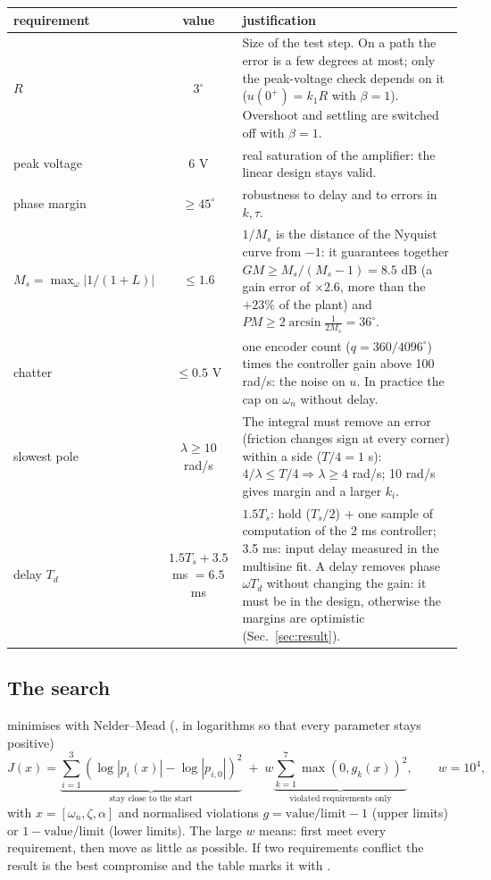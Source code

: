 \documentclass[10pt,a4paper]{article}
\newcommand{\code}[1]{\texttt{\detokenize{#1}}}
\begin{document}
\begin{tabularx}{\linewidth}{@{}l c X@{}}
\toprule
requirement & value & justification \\
\midrule
$R$ & 3$^\circ$ &
  Size of the test step. On a path the error is a few degrees at most; only the peak-voltage check depends on it
  ($u(0^+)=k_1R$ with $\beta=1$). Overshoot and settling are switched off with $\beta=1$. \\
peak voltage & 6 V & real saturation of the amplifier: the linear design stays valid. \\
phase margin & $\geq45^\circ$ & robustness to delay and to errors in $k,\tau$. \\
$M_s=\max_\omega|1/(1+L)|$ & $\leq1.6$ &
  $1/M_s$ is the distance of the Nyquist curve from $-1$: it guarantees together
  $GM\geq M_s/(M_s-1)=8.5$ dB (a gain error of $\times2.6$, more than the $+23\%$ of the plant) and
  $PM\geq2\arcsin\frac{1}{2M_s}=36^\circ$. \\
chatter & $\leq0.5$ V &
  one encoder count ($q=360/4096^\circ$) times the controller gain above 100 rad/s: the noise on $u$.
  In practice the cap on $\omega_n$ without delay. \\
slowest pole & $\lambda\geq10$ rad/s &
  The integral must remove an error (friction changes sign at every corner) within a side ($T/4=1$ s):
  $4/\lambda\leq T/4\Rightarrow\lambda\geq4$ rad/s; 10 rad/s gives margin and a larger $k_i$. \\
delay $T_d$ & $1.5T_s+3.5$ ms $=6.5$ ms &
  $1.5T_s$: hold ($T_s/2$) + one sample of computation of the 2 ms controller; 3.5 ms: input delay measured in the
  multisine fit. A delay removes phase $\omega T_d$ without changing the gain: it must be in the design, otherwise the
  margins are optimistic (Sec.~\ref{sec:result}). \\
\bottomrule
\end{tabularx}

\subsection{The search}
\code{pp_search.m} minimises with Nelder--Mead (\code{fminsearch}, in logarithms so that every parameter stays positive)
\begin{equation}
  J(x)=\underbrace{\sum_{i=1}^{3}\left(\log|p_i(x)|-\log|p_{i,0}|\right)^2}_{\text{stay close to the start}}
  \;+\;w\underbrace{\sum_{k=1}^{7}\max\left(0,g_k(x)\right)^2}_{\text{violated requirements only}},\qquad w=10^4,
\end{equation}
with $x=[\omega_n,\zeta,\alpha]$ and normalised violations $g=\text{value}/\text{limit}-1$ (upper limits) or
$1-\text{value}/\text{limit}$ (lower limits). The large $w$ means: first meet every requirement, then move as little as
possible. If two requirements conflict the result is the best compromise and the table marks it with \code{*}.
\end{document}
